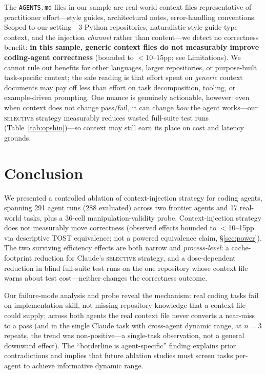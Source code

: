 \documentclass[11pt]{article}
\newcommand{\agentsmd}{\texttt{AGENTS.md}}
\newcommand{\selective}{\textsc{selective}}
\begin{document}
The \agentsmd{} files in our sample are real-world context files representative of practitioner effort---style guides, architectural notes, error-handling conventions.
Scoped to our setting---3 Python repositories, naturalistic style-guide-type context, and the injection \emph{channel} rather than content---we detect no correctness benefit: \textbf{in this sample, generic context files do not measurably improve coding-agent correctness} (bounded to ${<}10$--$15$pp; see Limitations).
We cannot rule out benefits for other languages, larger repositories, or purpose-built task-specific context; the safe reading is that effort spent on \emph{generic} context documents may pay off less than effort on task decomposition, tooling, or example-driven prompting.
One nuance is genuinely actionable, however: even when context does not change pass/fail, it can change \emph{how} the agent works---our \selective{} strategy measurably reduces wasted full-suite test runs (Table~\ref{tab:opshin})---so context may still earn its place on cost and latency grounds.

\section{Conclusion}

We presented a controlled ablation of context-injection strategy for coding agents, spanning 291 agent runs (288 evaluated) across two frontier agents and 17 real-world tasks, plus a 36-cell manipulation-validity probe.
Context-injection strategy does not measurably move correctness (observed effects bounded to $<$10--15pp via descriptive TOST equivalence; not a powered equivalence claim, \S\ref{sec:power}).
The two surviving efficiency effects are both narrow and \emph{process-level}: a cache-footprint reduction for Claude's \selective{} strategy, and a dose-dependent reduction in blind full-suite test runs on the one repository whose context file warns about test cost---neither changes the correctness outcome.

Our failure-mode analysis and probe reveal the mechanism: real coding tasks fail on implementation skill, not missing repository knowledge that a context file could supply; across both agents the real context file never converts a near-miss to a pass (and in the single Claude task with cross-agent dynamic range, at $n{=}3$ repeats, the trend was non-positive---a single-task observation, not a general downward effect).
The ``borderline is agent-specific'' finding explains prior contradictions and implies that future ablation studies must screen tasks per-agent to achieve informative dynamic range.
\end{document}
